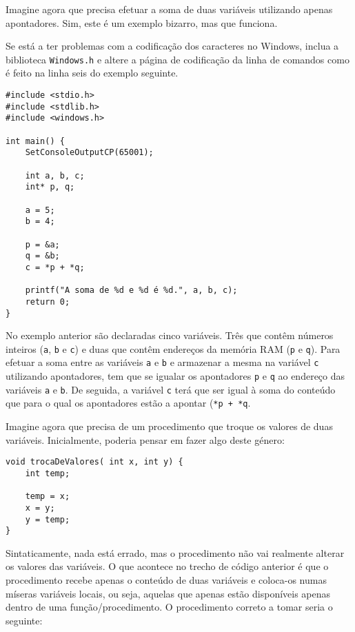 Imagine agora que precisa efetuar a soma de duas variáveis utilizando apenas apontadores. Sim, este é um exemplo bizarro, mas que funciona.

\begin{mdframed}[backgroundcolor=cinzaclaro, linewidth=0pt]
Se está a ter problemas com a codificação dos caracteres no Windows, inclua a biblioteca \texttt{Windows.h} e altere a página de codificação da linha de comandos como é feito na linha seis do exemplo seguinte.
\end{mdframed}

\begin{lstlisting}
#include <stdio.h>
#include <stdlib.h>
#include <windows.h>

int main() {
    SetConsoleOutputCP(65001);

    int a, b, c;
    int* p, q;

    a = 5;
    b = 4;
    
    p = &a;
    q = &b;
    c = *p + *q;

    printf("A soma de %d e %d é %d.", a, b, c);
    return 0;
}
\end{lstlisting}

No exemplo anterior são declaradas cinco variáveis. Três que contêm números inteiros (\texttt{a}, \texttt{b} e \texttt{c}) e duas que contêm endereços da memória RAM (\texttt{p} e \texttt{q}). Para efetuar a soma entre as variáveis \texttt{a} e \texttt{b} e armazenar a mesma na variável \texttt{c} utilizando apontadores, tem que se igualar os apontadores \texttt{p} e \texttt{q} ao endereço das variáveis \texttt{a} e \texttt{b}. De seguida, a variável \texttt{c} terá que ser igual à soma do conteúdo que para o qual os apontadores estão a apontar (\texttt{*p + *q}.

Imagine agora que precisa de um procedimento que troque os valores de duas variáveis. Inicialmente, poderia pensar em fazer algo deste género:

\begin{lstlisting}
void trocaDeValores( int x, int y) {
    int temp;

    temp = x;
    x = y;
    y = temp;
}
\end{lstlisting}

Sintaticamente, nada está errado, mas o procedimento não vai realmente alterar os valores das variáveis. O que acontece no trecho de código anterior é que o procedimento recebe apenas o conteúdo de duas variáveis e coloca-os numas míseras variáveis locais, ou seja, aquelas que apenas estão disponíveis apenas dentro de uma função/procedimento. O procedimento correto a tomar seria o seguinte:

